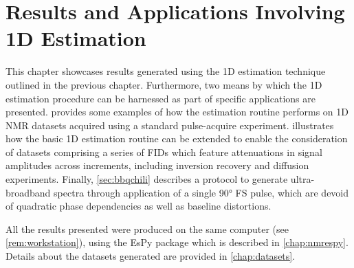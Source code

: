 \chapter{Results and Applications Involving 1D Estimation}
\label{chap:results}

This chapter showcases results generated using the \ac{1D} estimation
technique outlined in the previous chapter. Furthermore, two means by
which the \ac{1D} estimation procedure can be harnessed as part of
specific applications are presented.
 provides some examples of how the estimation
routine performs on \ac{1D} \ac{NMR} datasets acquired using a standard
pulse-acquire experiment.  illustrates how the basic \ac{1D}
estimation routine
can be extended to enable the consideration of datasets comprising a series of
\acp{FID} which feature attenuations in signal amplitudes across increments,
including inversion recovery and diffusion experiments. Finally,
\cref{sec:bbqchili} describes a protocol to generate ultra-broadband spectra
through application of a single \ang{90} \acl{FS} pulse, which are devoid of
quadratic phase dependencies as well as baseline distortions.

All the results presented were produced on the same computer (see
\cref{rem:workstation}), using the \ac{EsPy} package which is
described in \cref{chap:nmrespy}. Details about the datasets generated are
provided in \cref{chap:datasets}.





